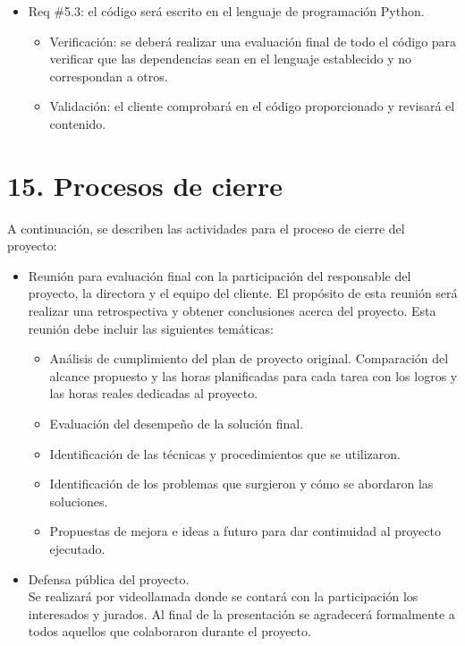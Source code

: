 \documentclass[
11pt, %
]{charter}
\begin{document}
\begin{itemize}
\item Req \#5.3: el código será escrito en el lenguaje de programación Python.
\begin{itemize}
	\item Verificación: se deberá realizar una evaluación final de todo el código para verificar que las dependencias
	sean en el lenguaje establecido y no correspondan a otros.
	\item Validación: el cliente comprobará en el código proporcionado y revisará el contenido.
\end{itemize}

\end{itemize}



\section{15. Procesos de cierre}    
\label{sec:cierre}

A continuación, se describen las actividades para el proceso de cierre del proyecto:
\begin{itemize}
\item Reunión para evaluación final con la participación del responsable del proyecto, la directora y el equipo
del cliente. El propósito de esta reunión será realizar una retrospectiva y obtener conclusiones 
acerca del proyecto. Esta reunión debe incluir las siguientes temáticas:
    
\begin{itemize}
        \item Análisis de cumplimiento del plan de proyecto original. Comparación del alcance
        propuesto y las horas planificadas para cada tarea con los logros y las horas reales
        dedicadas al proyecto.
        \item Evaluación del desempeño de la solución final.
        \item Identificación de las técnicas y procedimientos que se utilizaron.
        \item Identificación de los problemas que surgieron y cómo se abordaron las soluciones.
        \item Propuestas de mejora e ideas a futuro para dar continuidad al proyecto ejecutado. 
\end{itemize}

\item Defensa pública del proyecto. \\
Se realizará por videollamada donde se contará con la participación los interesados y jurados. Al final de 
la presentación se agradecerá formalmente a todos aquellos que colaboraron durante el proyecto.
\end{itemize}
\end{document}
